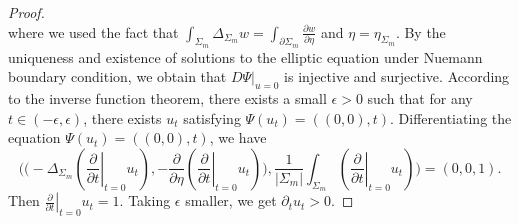 \documentclass[10pt,a4paper]{amsart}
\begin{document}
\begin{proof}
\[    \]
    where we used the fact that $\int_{\Sigma_{m}}\Delta_{\Sigma_{m}}w=\int_{\partial \Sigma_{m}}\frac{\partial w}{\partial \eta}$ and $\eta = \eta_{\Sigma_{m}}$.
    By the uniqueness and existence of solutions to the elliptic equation under Nuemann boundary condition, we obtain that $D\Psi|_{u=0}$ is injective and surjective. According to the inverse function theorem, there exists a small $\epsilon>0$ such that for any $t\in (-\epsilon,\epsilon)$, there exists $u_{t}$ satisfying $\Psi(u_{t})=((0,0),t)$. Differentiating the equation $\Psi(u_{t})=((0,0),t)$, we have
    \[
    \Big(\big(-\Delta_{\Sigma_{m}}(\left.\frac{\partial }{\partial t}\right|_{t=0}u_{t}),-\frac{\partial}{\partial\eta}(\left.\frac{\partial}{\partial t}\right|_{t=0}u_{t})\big),\frac{1}{|\Sigma_{m}|}\int_{\Sigma_{m}}(\left.\frac{\partial}{\partial t}\right|_{t=0}u_{t})\Big)=(0,0,1).
    \]
    Then $\left.\frac{\partial}{\partial t}\right|_{t=0}u_{t}=1$. Taking $\epsilon$ smaller, we get $\partial_{t}u_{t}>0$. 
\end{proof}
\end{document}
